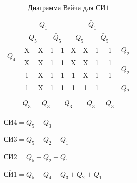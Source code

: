 \documentclass[a4paper,14pt]{article}
\begin{document}
\begin{table}[H]
	\begin{center}
		\caption{\label{tab:SN1_tab} Диаграмма Вейча для $\overline{\text{СИ}1}$ }
		\begin{tabular}{cccccccccc}
			& \multicolumn{4}{c}{$Q_1$} & \multicolumn{4}{c}{$\bar{Q}_1$} &  \\
			& \multicolumn{2}{c}{$Q_5$} & \multicolumn{2}{c}{$\bar{Q}_5$} & \multicolumn{2}{c}{$Q_5$} & \multicolumn{2}{c}{$\bar{Q}_5$} &  \\ \cline{2-9}
			\multicolumn{1}{c|}{\multirow{2}{*}{$Q_4$}} & \multicolumn{1}{c|}{X} & \multicolumn{1}{c|}{X} & \multicolumn{1}{c|}{1} & \multicolumn{1}{c|}{1} & \multicolumn{1}{c|}{X} & \multicolumn{1}{c|}{X} & \multicolumn{1}{c|}{1} & \multicolumn{1}{c|}{1} & $\bar{Q}_2$ \\ \cline{2-9}
			\multicolumn{1}{c|}{} & \multicolumn{1}{c|}{X} & \multicolumn{1}{c|}{X} & \multicolumn{1}{c|}{1} & \multicolumn{1}{c|}{1} & \multicolumn{1}{c|}{X} & \multicolumn{1}{c|}{X} & \multicolumn{1}{c|}{1} & \multicolumn{1}{c|}{1} & \multirow{2}{*}{$Q_2$} \\ \cline{2-9}
			\multicolumn{1}{c|}{\multirow{2}{*}{}} & \multicolumn{1}{c|}{1} & \multicolumn{1}{c|}{X} & \multicolumn{1}{c|}{1} & \multicolumn{1}{c|}{1} & \multicolumn{1}{c|}{1} & \multicolumn{1}{c|}{X} & \multicolumn{1}{c|}{1} & \multicolumn{1}{c|}{1} &  \\ \cline{2-9}
			\multicolumn{1}{c|}{} & \multicolumn{1}{c|}{1} & \multicolumn{1}{c|}{X} & \multicolumn{1}{c|}{1} & \multicolumn{1}{c|}{1} & \multicolumn{1}{c|}{1} & \multicolumn{1}{c|}{1} & \multicolumn{1}{c|}{1} & \multicolumn{1}{c|}{} & $\bar{Q}_2$ \\ \cline{2-9}
			&  & \multicolumn{2}{c}{} & \multicolumn{2}{c}{} & \multicolumn{2}{c}{} &  &  \\
			& $\bar{Q}_3$ & \multicolumn{2}{c}{$Q_3$} & \multicolumn{2}{c}{$\bar{Q}_3$} & \multicolumn{2}{c}{$Q_3$} & $\bar{Q}_3$ & 
		\end{tabular}
	\end{center}
\end{table}

$\overline{\text{СИ}4} = \overline{Q}_5 + \overline{Q}_3$

$\overline{\text{СИ}3} = \overline{Q}_5 + \overline{Q}_2 + \overline{Q}_1$

$\overline{\text{СИ}2} = \overline{Q}_5 + \overline{Q}_2 + Q_1$

$\overline{\text{СИ}1} = Q_5 + Q_4 + Q_3 + Q_2 + Q_1$
\end{document}
